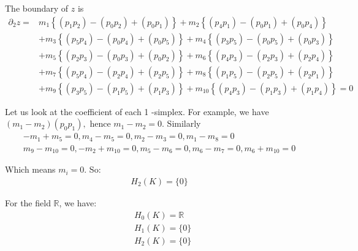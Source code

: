\documentclass[]{ctexart}
\begin{document}
			The boundary of $z$ is
				\begin{equation*}
				\begin{aligned}
					\partial_{2} z=& m_{1}\left\{\left(p_{1} p_{2}\right)-\left(p_{0} p_{2}\right)+\left(p_{0} p_{1}\right)\right\}+m_{2}\left\{\left(p_{4} p_{1}\right)-\left(p_{0} p_{1}\right)+\left(p_{0} p_{4}\right)\right\} \\
					&+m_{3}\left\{\left(p_{5} p_{4}\right)-\left(p_{0} p_{4}\right)+\left(p_{0} p_{5}\right)\right\} +m_{4}\left\{\left(p_{3} p_{5}\right)-\left(p_{0} p_{5}\right)+\left(p_{0} p_{3}\right)\right\} \\
					&+m_{5}\left\{\left(p_{2} p_{3}\right)-\left(p_{0} p_{3}\right)+\left(p_{0} p_{2}\right)\right\} +m_{6}\left\{\left(p_{4} p_{3}\right)-\left(p_{2} p_{3}\right)+\left(p_{2} p_{4}\right)\right\} \\
					&+m_{7}\left\{\left(p_{5} p_{4}\right)-\left(p_{2} p_{4}\right)+\left(p_{2} p_{5}\right)\right\} +m_{8}\left\{\left(p_{1} p_{5}\right)-\left(p_{2} p_{5}\right)+\left(p_{2} p_{1}\right)\right\} \\
					&+m_{9}\left\{\left(p_{3} p_{5}\right)-\left(p_{1} p_{5}\right)+\left(p_{1} p_{3}\right)\right\}+m_{10}\left\{\left(p_{4} p_{3}\right)-\left(p_{1} p_{3}\right)+\left(p_{1} p_{4}\right)\right\}=0
				\end{aligned}
				\end{equation*}
				
			Let us look at the coefficient of each 1 -simplex. For example, we have $\left(m_{1}-\right.\left.m_{2}\right)\left(p_{0} p_{1}\right),$ hence $m_{1}-m_{2}=0 .$ Similarly
				\begin{equation*}
				\begin{aligned}
					-m_{1}+m_{5}=0, m_{4}-m_{5}=0, m_{2}-m_{3}=0, m_{1}-m_{8}=0 \\
					m_{9}-m_{10}=0,-m_{2}+m_{10}=0, m_{5}-m_{6}=0, m_{6}-m_{7}=0 ,m_{6}+m_{10}=0
				\end{aligned}
				\end{equation*}
				
			Which means $m_i=0$. So:
				\begin{equation*}
				\begin{aligned}
					H_2(K)=\{0\}
				\end{aligned}
				\end{equation*}
				
			For the field $\mathbb{R}$, we have:
				\begin{equation*}
				\begin{aligned}
					&H_0(K)=\mathbb{R}\\
					&H_1(K)=\{0\}\\
					&H_2(K)=\{0\}
				\end{aligned}
				\end{equation*}
			
\end{document}
